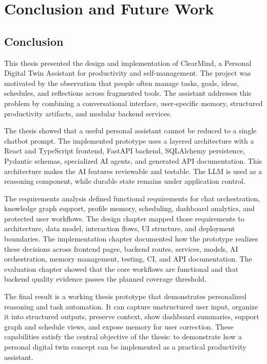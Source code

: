 \chapter{Conclusion and Future Work}

\section{Conclusion}

This thesis presented the design and implementation of ClearMind, a Personal Digital Twin Assistant for productivity and self-management. The project was motivated by the observation that people often manage tasks, goals, ideas, schedules, and reflections across fragmented tools. The assistant addresses this problem by combining a conversational interface, user-specific memory, structured productivity artifacts, and modular backend services.

The thesis showed that a useful personal assistant cannot be reduced to a single chatbot prompt. The implemented prototype uses a layered architecture with a React and TypeScript frontend, FastAPI backend, SQLAlchemy persistence, Pydantic schemas, specialized AI agents, and generated API documentation. This architecture makes the AI features reviewable and testable. The LLM is used as a reasoning component, while durable state remains under application control.

The requirements analysis defined functional requirements for chat orchestration, knowledge graph support, profile memory, scheduling, dashboard analytics, and protected user workflows. The design chapter mapped those requirements to architecture, data model, interaction flows, UI structure, and deployment boundaries. The implementation chapter documented how the prototype realizes these decisions across frontend pages, backend routes, services, models, AI orchestration, memory management, testing, CI, and API documentation. The evaluation chapter showed that the core workflows are functional and that backend quality evidence passes the planned coverage threshold.

The final result is a working thesis prototype that demonstrates personalized reasoning and task automation. It can capture unstructured user input, organize it into structured outputs, preserve context, show dashboard summaries, support graph and schedule views, and expose memory for user correction. These capabilities satisfy the central objective of the thesis: to demonstrate how a personal digital twin concept can be implemented as a practical productivity assistant.

